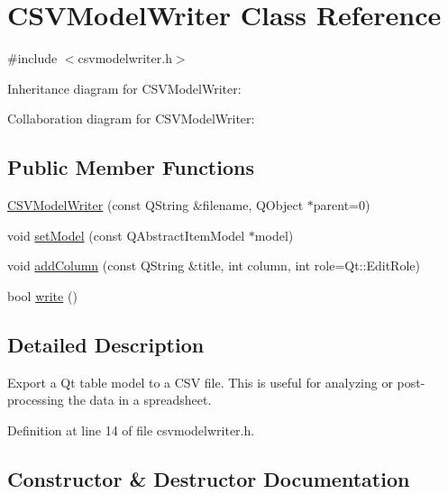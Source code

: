 \hypertarget{class_c_s_v_model_writer}{}\section{C\+S\+V\+Model\+Writer Class Reference}
\label{class_c_s_v_model_writer}


{\ttfamily \#include $<$csvmodelwriter.\+h$>$}



Inheritance diagram for C\+S\+V\+Model\+Writer\+:


Collaboration diagram for C\+S\+V\+Model\+Writer\+:
\subsection*{Public Member Functions}
\begin{DoxyCompactItemize}
\item 
\hyperlink{class_c_s_v_model_writer_a343d5ebba512dea41a62e11e45a6d175}{C\+S\+V\+Model\+Writer} (const Q\+String \&filename, Q\+Object $\ast$parent=0)
\item 
void \hyperlink{class_c_s_v_model_writer_a7b8be6f49a66b965a94a89c78fb96e40}{set\+Model} (const Q\+Abstract\+Item\+Model $\ast$model)
\item 
void \hyperlink{class_c_s_v_model_writer_a9e5f0d60f2c873747582ce21ddeb53b5}{add\+Column} (const Q\+String \&title, int column, int role=Qt\+::\+Edit\+Role)
\item 
bool \hyperlink{class_c_s_v_model_writer_a71fe52fdd6f41c506f9631175cb04615}{write} ()
\end{DoxyCompactItemize}


\subsection{Detailed Description}
Export a Qt table model to a C\+S\+V file. This is useful for analyzing or post-\/processing the data in a spreadsheet. 

Definition at line 14 of file csvmodelwriter.\+h.



\subsection{Constructor \& Destructor Documentation}
\hypertarget{class_c_s_v_model_writer_a343d5ebba512dea41a62e11e45a6d175}{}
